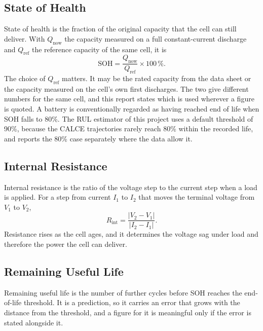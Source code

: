 \documentclass[12pt,a4paper]{amritareport}
\begin{document}
\subsection{State of Health}

State of health is the fraction of the original capacity that the cell can still deliver. With $Q_{\mathrm{now}}$ the capacity measured on a full constant-current discharge and $Q_{\mathrm{ref}}$ the reference capacity of the same cell, it is
\begin{equation}
	\mathrm{SOH} = \frac{Q_{\mathrm{now}}}{Q_{\mathrm{ref}}} \times 100\,\%.
	\label{eq:sohdef}
\end{equation}
The choice of $Q_{\mathrm{ref}}$ matters. It may be the rated capacity from the data sheet or the capacity measured on the cell's own first discharges. The two give different numbers for the same cell, and this report states which is used wherever a figure is quoted. A battery is conventionally regarded as having reached end of life when SOH falls to 80\%. The RUL estimator of this project uses a default threshold of 90\%, because the CALCE trajectories rarely reach 80\% within the recorded life, and reports the 80\% case separately where the data allow it.

\subsection{Internal Resistance}

Internal resistance is the ratio of the voltage step to the current step when a load is applied. For a step from current $I_{1}$ to $I_{2}$ that moves the terminal voltage from $V_{1}$ to $V_{2}$,
\begin{equation}
	R_{\mathrm{int}} = \frac{\left|V_{2}-V_{1}\right|}{\left|I_{2}-I_{1}\right|}.
	\label{eq:rintdef}
\end{equation}
Resistance rises as the cell ages, and it determines the voltage sag under load and therefore the power the cell can deliver.

\subsection{Remaining Useful Life}

Remaining useful life is the number of further cycles before SOH reaches the end-of-life threshold. It is a prediction, so it carries an error that grows with the distance from the threshold, and a figure for it is meaningful only if the error is stated alongside it.
\end{document}
